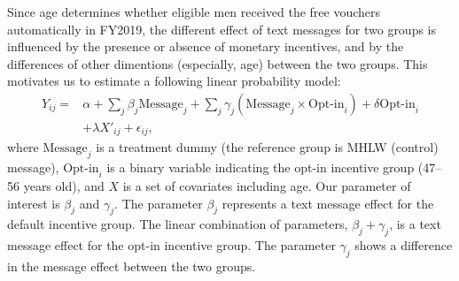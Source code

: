 \documentclass[
]{article}
\begin{document}
Since age determines whether eligible men received the free vouchers automatically in FY2019, the different effect of text messages for two groups is influenced by the presence or absence of monetary incentives, and by the differences of other dimentions (especially, age) between the two groups. This motivates us to estimate a following linear probability model:
\begin{equation}
\begin{split}
Y_{ij} = &\alpha + \sum_j \beta_j \text{Message}_j + \sum_j \gamma_j (\text{Message}_j \times \text{Opt-in}_i) + \delta \text{Opt-in}_i \\
&+ \lambda X'_{ij} + \epsilon_{ij},
\end{split} \label{eq:regression}
\end{equation}
where \(\text{Message}_j\) is a treatment dummy (the reference group is MHLW (control) message), \(\text{Opt-in}_i\) is a binary variable indicating the opt-in incentive group (47--56 years old), and \(X\) is a set of covariates including age. Our parameter of interest is \(\beta_j\) and \(\gamma_j\). The parameter \(\beta_j\) represents a text message effect for the default incentive group. The linear combination of parameters, \(\beta_j + \gamma_j\), is a text message effect for the opt-in incentive group. The parameter \(\gamma_j\) shows a difference in the message effect between the two groups.
\end{document}
